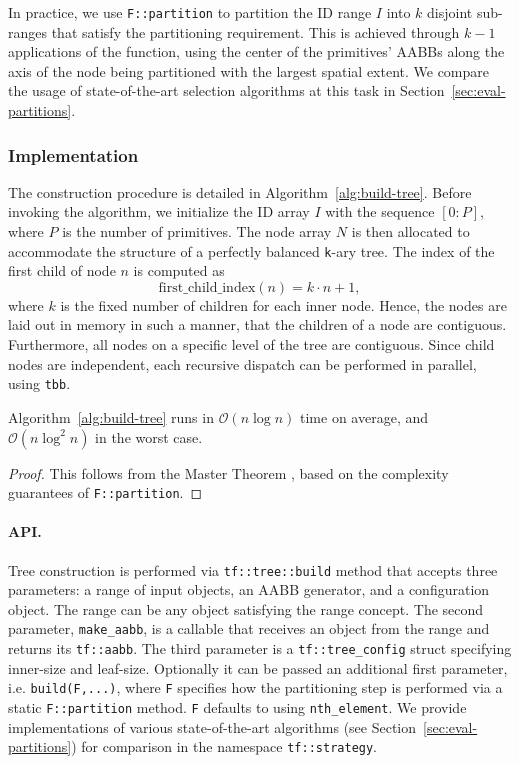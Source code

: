 In practice, we use \texttt{F::partition} to partition
the ID range $I$ into $k$ disjoint sub-ranges that satisfy
the partitioning requirement. This is achieved through
$k - 1$ applications of the function, using the center of
the primitives’ AABBs along the axis of the node being
partitioned with the largest spatial extent.
We compare the usage of state-of-the-art selection
algorithms at this task in
Section~\ref{sec:eval-partitions}.

\subsubsection{Implementation}

The construction procedure is detailed in
Algorithm~\ref{alg:build-tree}. Before invoking the
algorithm, we initialize the ID array $I$ with the sequence
$[0 : P]$, where $P$ is the number of primitives. The node
array $N$ is then allocated to accommodate the structure of
a perfectly balanced \texttt{k}-ary tree. The index of the
first child of node $n$ is computed as
\[
	\mathrm{first\_child\_index}(n) = k \cdot n + 1,
\]
where $k$ is the fixed number of children for each
inner node. Hence, the nodes are laid out in memory
in such a manner, that the children of a node are
contiguous. Furthermore, all nodes on a specific level
of the tree are contiguous.
Since child nodes are independent, each
recursive dispatch can be performed in parallel,
using \texttt{tbb}\cite{tbb}.

\begin{theorem}
	Algorithm~\ref{alg:build-tree} runs in
	$\mathcal{O}(n \log n)$ time on average, and
	$\mathcal{O}(n \log^2 n)$ in the worst case.
\end{theorem}

\begin{proof}
	This follows from the Master Theorem
	\cite{master-theorem}, based on the complexity guarantees
	of \texttt{F::partition}.
\end{proof}

\paragraph*{API.} Tree construction is performed via 
\texttt{tf::tree::build} method that accepts three parameters:
a range of input objects, an AABB generator, and
a configuration object. The range can be any object 
satisfying the \cpp range concept. The second parameter,
\texttt{make\_aabb}, is a callable that receives an object
from the range and returns its \texttt{tf::aabb}. The third parameter
is a \texttt{tf::tree\_config} struct specifying inner-size and leaf-size.
Optionally it can be passed an additional first parameter, i.e. \texttt{build(F,...)},
where \texttt{F} specifies how the partitioning step is performed via
a static \texttt{F::partition} method. \texttt{F} defaults to
using \texttt{nth\_element}. We provide implementations of
various state-of-the-art algorithms\cite{mini-select}
(see Section~\ref{sec:eval-partitions})
for comparison in the namespace \texttt{tf::strategy}.

